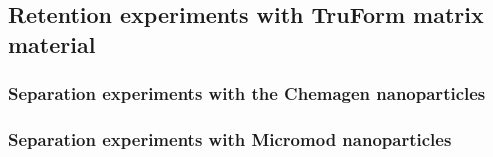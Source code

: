 \begin{figure}
\centering
{}
\caption[]{
\label{fig:norm_area_PMMA}
}
\end{figure}


\begin{figure}
\centering
{}
\caption[]{
\label{fig:norm_ret_PMMA}
}
\end{figure}

\FloatBarrier
\subsection{Retention experiments with TruForm matrix material}
\label{subsec:trufrom_res}

\subsubsection{Separation experiments with the Chemagen nanoparticles}
\label{subsubsec:chemagen_res}

\subsubsection{Separation experiments with Micromod nanoparticles}
\label{subsubsec:micromod_res}